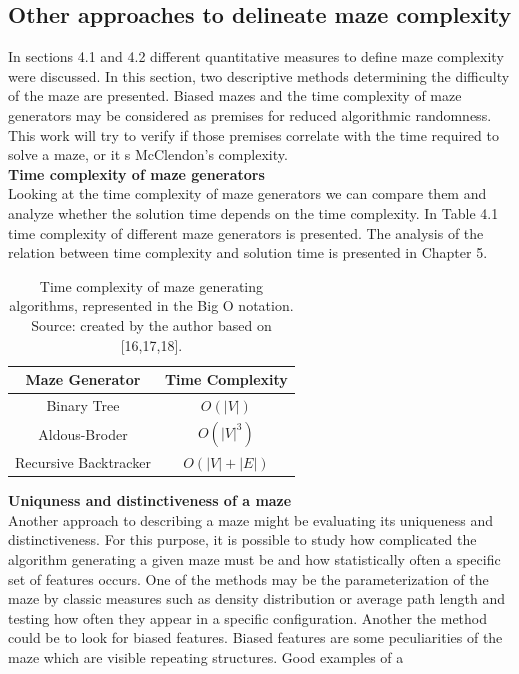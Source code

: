 \subsection{Other approaches to delineate maze complexity }
In sections 4.1 and 4.2 different quantitative measures to define maze complexity were discussed. In this section, two descriptive methods determining the difficulty of the maze are presented. Biased mazes and the time complexity of maze generators may be considered as premises for reduced algorithmic randomness. This work will try to verify if those premises correlate with the time required to solve a maze, or it s McClendon’s complexity.\\ \newline
\indent \textbf{Time complexity of maze generators}\\
\indent Looking at the time complexity of maze generators we can compare them and analyze whether the solution time depends on the time complexity. In Table 4.1 time complexity of different maze generators is presented. The analysis of the relation between time complexity and solution time is presented in Chapter 5.\\
\begin{table}[!ht]
\centering
\begin{tabular}{ |c||c| } 
\hline 
Maze Generator& Time Complexity\\ \hline
Binary Tree\cite{16} & $O(|V|)$\\
Aldous-Broder\cite{17}& $O(|V|^3)$\\ 
Recursive Backtracker\cite{18}& $O(|V|+|E|)$\\ 
\hline
 \end{tabular} 
\caption{Time complexity of maze generating algorithms, represented in the Big O notation.\\Source: created by the author based on [16,17,18].} 
 \end{table}
 \newpage
\indent\textbf{Uniquness and distinctiveness of a maze}\\
\indent Another approach to describing a maze might be evaluating its uniqueness and distinctiveness. For this purpose, it is possible to study how complicated the
algorithm generating a given maze must be and how statistically often a specific set of features occurs. One of the methods may be the parameterization of
the maze by classic measures such as density distribution or average path length and testing how often they appear in a specific configuration. Another
the method could be to look for biased features. Biased features are some peculiarities of the maze which are visible repeating structures. Good examples of a
